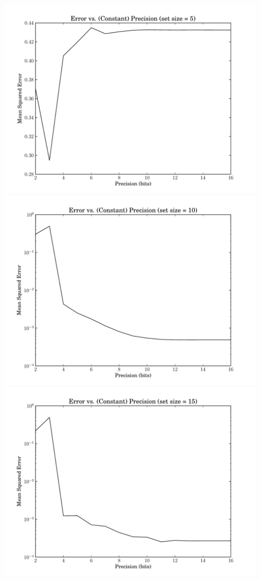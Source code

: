 \documentclass[12pt]{article}
\begin{document}
\begin{center}
\includegraphics[scale=0.7]{error-vs-prec-ss5}
\includegraphics[scale=0.7]{error-vs-prec-ss10}
\includegraphics[scale=0.7]{error-vs-prec-ss15}
\end{center}
\end{document}
